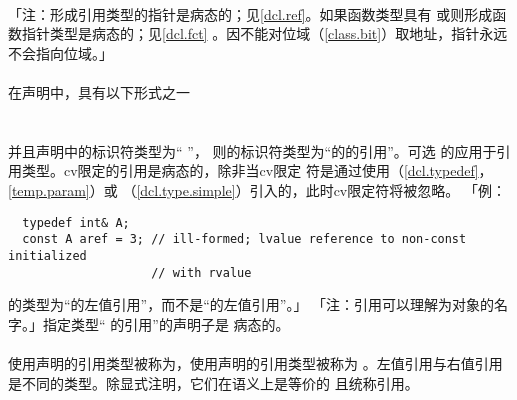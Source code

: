 \paragraph{}
「注：形成引用类型的指针是病态的；见\ref{dcl.ref}。如果函数类型具有
或则形成函数指针类型是病态的；见\ref{dcl.fct}
。因不能对位域（\ref{class.bit}）取地址，指针永远不会指向位域。」

\paragraph{}
在声明中，具有以下形式之一                                      \\
\mbox{\qquad\tm{\&}  }           \\
\mbox{\qquad\tm{\&\&}  }         \\
并且声明中的标识符类型为`` ''，
则的标识符类型为``的的引用''。可选
的应用于引用类型。cv限定的引用是病态的，除非当cv限定
符是通过使用（\ref{dcl.typedef}，\ref{temp.param}）或
（\ref{dcl.type.simple}）引入的，此时cv限定符将被忽略。
「例：
\begin{lstlisting}
  typedef int& A;
  const A aref = 3; // ill-formed; lvalue reference to non-const initialized
                    // with rvalue
\end{lstlisting}
的类型为``的左值引用''，而不是``的左值引用''。」
「注：引用可以理解为对象的名字。」指定类型`` 的引用''的声明子是
病态的。

\paragraph{}
使用\tm{\&}声明的引用类型被称为，使用\tm{\&\&}声明的引用类型被称为
。左值引用与右值引用是不同的类型。除显式注明，它们在语义上是等价的
且统称引用。


